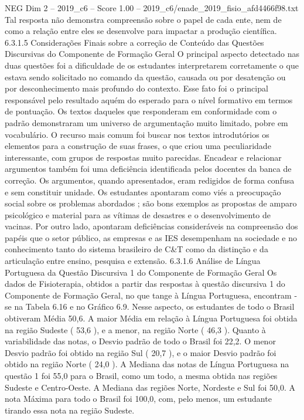 \begin{textsample}{NEG Dim 2 – 2019\_c6 – Score 1.00 – 2019\_c6/enade\_2019\_fisio\_afd4466f98.txt}
Tal resposta não demonstra compreensão sobre o papel de cada ente, nem de como a relação entre eles se desenvolve para impactar a produção científica. 6.3.1.5 Considerações Finais sobre a correção de Conteúdo das Questões Discursivas do Componente de Formação Geral O principal aspecto detectado nas duas questões foi a dificuldade de os estudantes interpretarem corretamente o que estava sendo solicitado no comando da questão, causada ou por desatenção ou por desconhecimento mais profundo do contexto.
Esse fato foi o principal responsável pelo resultado aquém do esperado para o nível formativo em termos de pontuação.
Os textos daqueles que responderam em conformidade com o padrão demonstraram um universo de argumentação muito limitado, pobre em vocabulário.
O recurso mais comum foi buscar nos textos introdutórios os elementos para a construção de suas frases, o que criou uma peculiaridade interessante, com grupos de respostas muito parecidas.
Encadear e relacionar argumentos também foi uma deficiência identificada pelos docentes da banca de correção.
Os argumentos, quando apresentados, eram redigidos de forma confusa e sem constituir unidade.
Os estudantes apontaram como viés a preocupação social sobre os problemas abordados ; são bons exemplos as propostas de amparo psicológico e material para as vítimas de desastres e o desenvolvimento de vacinas.
Por outro lado, apontaram deficiências consideráveis na compreensão dos papéis que o setor público, as empresas e as IES desempenham na sociedade e no conhecimento tanto do sistema brasileiro de C\&T como da distinção e da articulação entre ensino, pesquisa e extensão. 6.3.1.6 Análise de Língua Portuguesa da Questão Discursiva 1 do Componente de Formação Geral Os dados de Fisioterapia, obtidos a partir das respostas à questão discursiva 1 do Componente de Formação Geral, no que tange à Língua Portuguesa, encontram -se na Tabela 6.16 e no Gráfico 6.9.
Nesse aspecto, os estudantes de todo o Brasil obtiveram Média 50,6.
A maior Média em relação à Língua Portuguesa foi obtida na região Sudeste ( 53,6 ), e a menor, na região Norte ( 46,3 ).
Quanto à variabilidade das notas, o Desvio padrão de todo o Brasil foi 22,2.
O menor Desvio padrão foi obtido na região Sul ( 20,7 ), e o maior Desvio padrão foi obtido na região Norte ( 24,0 ).
A Mediana das notas de Língua Portuguesa na questão 1 foi 55,0 para o Brasil, como um todo, a mesma obtida nas regiões Sudeste e Centro-Oeste.
A Mediana das regiões Norte, Nordeste e Sul foi 50,0.
A nota Máxima para todo o Brasil foi 100,0, com, pelo menos, um estudante tirando essa nota na região Sudeste.

\end{textsample}
